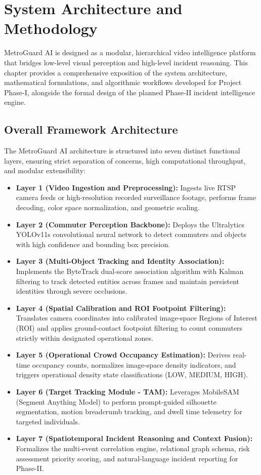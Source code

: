\documentclass[12pt,a4paper]{report}
\begin{document}
\chapter{System Architecture and Methodology}
\noindent MetroGuard AI is designed as a modular, hierarchical video intelligence platform that bridges low-level visual perception and high-level incident reasoning. This chapter provides a comprehensive exposition of the system architecture, mathematical formulations, and algorithmic workflows developed for Project Phase-I, alongside the formal design of the planned Phase-II incident intelligence engine.

\section{Overall Framework Architecture}
The MetroGuard AI architecture is structured into seven distinct functional layers, ensuring strict separation of concerns, high computational throughput, and modular extensibility:
\begin{itemize}
    \item \textbf{Layer 1 (Video Ingestion and Preprocessing):} Ingests live RTSP camera feeds or high-resolution recorded surveillance footage, performs frame decoding, color space normalization, and geometric scaling.
    \item \textbf{Layer 2 (Commuter Perception Backbone):} Deploys the Ultralytics YOLOv11s convolutional neural network to detect commuters and objects with high confidence and bounding box precision.
    \item \textbf{Layer 3 (Multi-Object Tracking and Identity Association):} Implements the ByteTrack dual-score association algorithm with Kalman filtering to track detected entities across frames and maintain persistent identities through severe occlusions.
    \item \textbf{Layer 4 (Spatial Calibration and ROI Footpoint Filtering):} Translates camera coordinates into calibrated image-space Regions of Interest (ROI) and applies ground-contact footpoint filtering to count commuters strictly within designated operational zones.
    \item \textbf{Layer 5 (Operational Crowd Occupancy Estimation):} Derives real-time occupancy counts, normalizes image-space density indicators, and triggers operational density state classifications (LOW, MEDIUM, HIGH).
    \item \textbf{Layer 6 (Target Tracking Module - TAM):} Leverages MobileSAM (Segment Anything Model) to perform prompt-guided silhouette segmentation, motion breadcrumb tracking, and dwell time telemetry for targeted individuals.
    \item \textbf{Layer 7 (Spatiotemporal Incident Reasoning and Context Fusion):} Formalizes the multi-event correlation engine, relational graph schema, risk assessment priority scoring, and natural-language incident reporting for Phase-II.
\end{itemize}
\end{document}
